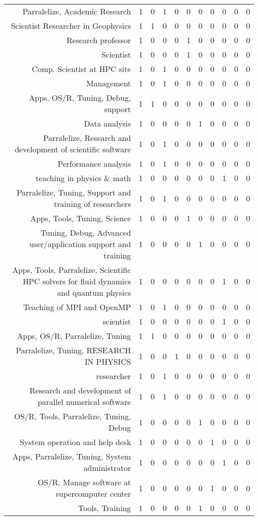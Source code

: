 {\begin{landscape}
\begin{longtable}[htb]{r|c|c|c|c|c|c|c|c|c|c}
{Parralelize, Academic Research} & 1 & 0 & 1 & 0 & 0 & 0 & 0 & 0 & 0 & 0 \\%
{Scientist Researcher in Geophysics} & 1 & 1 & 0 & 0 & 0 & 0 & 0 & 0 & 0 & 0 \\%
{Research professor} & 1 & 0 & 0 & 0 & 1 & 0 & 0 & 0 & 0 & 0 \\%
{Scientist} & 1 & 0 & 0 & 0 & 1 & 0 & 0 & 0 & 0 & 0 \\%
{Comp. Scientist at HPC site} & 1 & 0 & 1 & 0 & 0 & 0 & 0 & 0 & 0 & 0 \\%
{Management} & 1 & 0 & 1 & 0 & 0 & 0 & 0 & 0 & 0 & 0 \\%
{Apps, OS/R, Tuning, Debug, support} & 1 & 1 & 0 & 0 & 0 & 0 & 0 & 0 & 0 & 0 \\%
{Data analysis} & 1 & 0 & 0 & 0 & 0 & 1 & 0 & 0 & 0 & 0 \\%
{Parralelize, Research and development of scientific software} & 1 & 0 & 1 & 0 & 0 & 0 & 0 & 0 & 0 & 0 \\%
{Performance analysis} & 1 & 0 & 1 & 0 & 0 & 0 & 0 & 0 & 0 & 0 \\%
{teaching in physics \& math} & 1 & 0 & 0 & 0 & 0 & 0 & 0 & 1 & 0 & 0 \\%
{Parralelize, Tuning, Support and training of researchers} & 1 & 0 & 1 & 0 & 0 & 0 & 0 & 0 & 0 & 0 \\%
{Apps, Tools, Tuning, Science} & 1 & 0 & 0 & 0 & 1 & 0 & 0 & 0 & 0 & 0 \\%
{Tuning, Debug, Advanced user/application support and training} & 1 & 0 & 0 & 0 & 0 & 1 & 0 & 0 & 0 & 0 \\%
{Apps, Tools, Parralelize, Scientific HPC solvers for fluid dynamics and quantum physics} & 1 & 0 & 0 & 0 & 0 & 0 & 0 & 1 & 0 & 0 \\%
{Teaching of MPI and OpenMP} & 1 & 0 & 1 & 0 & 0 & 0 & 0 & 0 & 0 & 0 \\%
{scientist} & 1 & 0 & 0 & 0 & 0 & 0 & 0 & 1 & 0 & 0 \\%
{Apps, OS/R, Parralelize, Tuning} & 1 & 1 & 0 & 0 & 0 & 0 & 0 & 0 & 0 & 0 \\%
{Parralelize, Tuning, RESEARCH IN PHYSICS} & 1 & 0 & 0 & 1 & 0 & 0 & 0 & 0 & 0 & 0 \\%
{researcher} & 1 & 0 & 1 & 0 & 0 & 0 & 0 & 0 & 0 & 0 \\%
{Research and development of parallel numerical software} & 1 & 0 & 1 & 0 & 0 & 0 & 0 & 0 & 0 & 0 \\%
{OS/R, Tools, Parralelize, Tuning, Debug} & 1 & 0 & 0 & 0 & 0 & 1 & 0 & 0 & 0 & 0 \\%
{System operation and help desk} & 1 & 0 & 0 & 0 & 0 & 0 & 1 & 0 & 0 & 0 \\%
{Apps, Parralelize, Tuning, System administrator} & 1 & 0 & 0 & 0 & 0 & 0 & 0 & 1 & 0 & 0 \\%
{OS/R, Manage software at supercomputer center} & 1 & 0 & 0 & 0 & 0 & 0 & 1 & 0 & 0 & 0 \\%
{Tools, Training} & 1 & 0 & 0 & 0 & 0 & 1 & 0 & 0 & 0 & 0 \\%
\hline%
\end{longtable}%
\end{landscape}}%
\clearpage%
